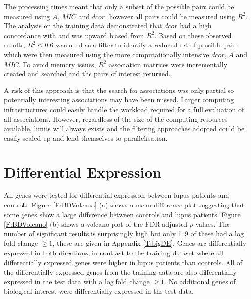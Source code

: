 \documentclass[a4paper, 12pt]{report}
\begin{document}
The processing times meant that only a subset of the possible pairs could be measured using $A$, $MIC$ and $dcor$, however all pairs could be measured using $R^2$. The analysis on the training data demonstrated that $dcor$ had a high concordance with and was upward biased from $R^2$. %
Based on these observed results, $R^2 \le 0.6$ was used as a filter to identify a reduced set of possible pairs which were then measured using the more computationally intensive $dcor$, $A$ and $MIC$. To avoid memory issues, $R^2$ association matrices were incrementally created and searched and the pairs of interest returned.

A risk of this approach is that the search for associations was only partial so potentially interesting associations may have been missed. Larger computing infrastructures could easily handle the workload required for a full evaluation of all associations. However, regardless of the size of the computing resources available, limits will always exists and the filtering approaches adopted could be easily scaled up and lend themselves to parallelisation.



\section{Differential Expression}
All genes were tested for differential expression between lupus patients and controls. Figure \ref{F:BDVolcano} (a) shows a mean-difference plot suggesting that some genes show a large difference between controls and lupus patients. Figure \ref{F:BDVolcano} (b) shows a volcano plot of the FDR adjusted $p$-values. The number of significant results is surprisingly high but only 119 of these had a log fold change $\ge 1$, these are given in Appendix \ref{T:bigDE}. Genes are differentially expressed in both directions, in contrast to the training dataset where all differentially expressed genes were higher in lupus patients than controls. All of the differentially expressed genes from the training data are also differentially expressed in the test data with a log fold change $\ge 1$. No additional genes of biological interest were differentially expressed in the test data. 
\end{document}
